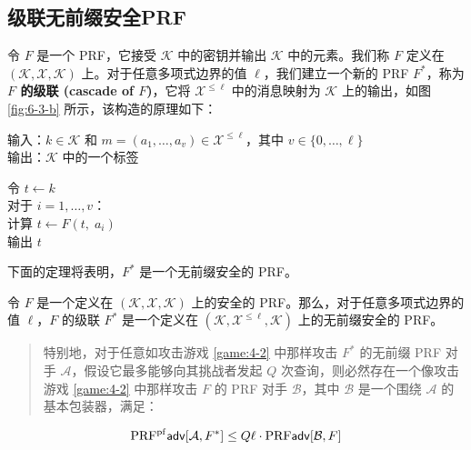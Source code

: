 \subsection{级联无前缀安全PRF}\label{subsec:6-4-2}

令 $F$ 是一个 PRF，它接受 $\mathcal{K}$ 中的密钥并输出 $\mathcal{K}$ 中的元素。我们称 $F$ 定义在 $(\mathcal{K},\mathcal{X},\mathcal{K})$ 上。对于任意多项式边界的值 $\ell$，我们建立一个新的 PRF $F^*$，称为 \textbf{$F$ 的级联 (cascade of $F$)}，它将 $\mathcal{X}^{\leq\ell}$ 中的消息映射为 $\mathcal{K}$ 上的输出，如图 \ref{fig:6-3-b} 所示，该构造的原理如下：

\vspace*{5pt}

\hspace*{5pt} 输入：$k\in\mathcal{K}$ 和 $m=(a_1,\dots,a_v)\in\mathcal{X}^{\leq\ell}$，其中 $v\in\{0,\dots,\ell\}$\\
\hspace*{26pt} 输出：$\mathcal{K}$ 中的一个标签

\vspace*{5pt}

\hspace*{5pt} 令 $t\leftarrow k$\\
\hspace*{26pt} 对于 $i=1,\dots,v$：\\
\hspace*{50pt} 计算 $t\leftarrow F(t,\;a_i)$\\
\hspace*{26pt} 输出 $t$

\vspace*{5pt}

\noindent
下面的定理将表明，$F^*$ 是一个无前缀安全的 PRF。

\begin{theorem}\label{theo:6-4}
令 $F$ 是一个定义在 $(\mathcal{K},\mathcal{X},\mathcal{K})$ 上的安全的 PRF。那么，对于任意多项式边界的值 $\ell$，$F$ 的级联 $F^*$ 是一个定义在 $(\mathcal{K},\mathcal{X}^{\leq\ell},\mathcal{K})$ 上的无前缀安全的 PRF。
\begin{quote}
特别地，对于任意如攻击游戏 \ref{game:4-2} 中那样攻击 $F^*$ 的无前缀 PRF 对手 $\mathcal{A}$，假设它最多能够向其挑战者发起 $Q$ 次查询，则必然存在一个像攻击游戏 \ref{game:4-2} 中那样攻击 $F$ 的 PRF 对手 $\mathcal{B}$，其中 $\mathcal{B}$ 是一个围绕 $\mathcal{A}$ 的基本包装器，满足：
\end{quote}
\begin{equation}\label{eq:6-15}
{\rm PRF^{pf}\mathsf{adv}}[\mathcal{A},F^*]\leq Q\ell\cdot{\rm PRF\mathsf{adv}}[\mathcal{B},F]
\end{equation}
\end{theorem}

